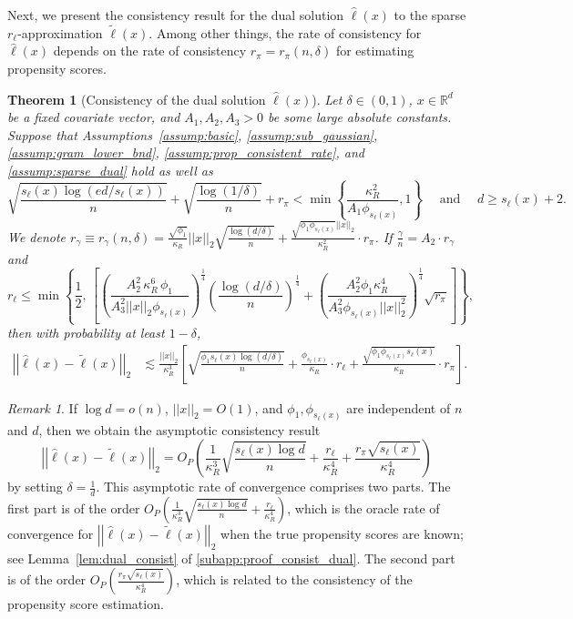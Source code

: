 \documentclass[ejsv2,noshowframe]{imsart}
\theoremstyle{plain}
\newtheorem{theorem}{Theorem}[section]
\theoremstyle{definition}
\theoremstyle{remark}
\newtheorem{remark}{Remark}
\newcommand{\norm}[1]{\left|\left| #1 \right|\right|}
\renewcommand{\hat}{\widehat}
\renewcommand{\tilde}{\widetilde}
\begin{document}
Next, we present the consistency result for the dual solution $\hat{\ell}(x)$ to the sparse $r_{\ell}$-approximation $\tilde{\ell}(x)$. Among other things, the rate of consistency for $\hat{\ell}(x)$ depends on the rate of consistency $r_{\pi}=r_{\pi}(n,\delta)$ for estimating propensity scores.


\begin{theorem}[Consistency of the dual solution $\hat{\ell}(x)$]
	\label{thm:dual_consist2}
	Let $\delta \in (0,1)$, $x\in \mathbb{R}^d$ be a fixed covariate vector, and $A_1,A_2,A_3>0$ be some large absolute constants. Suppose that Assumptions~\ref{assump:basic}, \ref{assump:sub_gaussian}, \ref{assump:gram_lower_bnd}, \ref{assump:prop_consistent_rate}, and \ref{assump:sparse_dual} hold
	as well as
	$$\sqrt{\frac{s_{\ell}(x)\log(ed/s_{\ell}(x))}{n}} + \sqrt{\frac{\log(1/\delta)}{n}} + r_{\pi} < \min\left\{\frac{\kappa_R^2}{A_1 \phi_{s_{\ell}(x)}}, 1 \right\} \quad \text{ and } \quad d\geq s_{\ell}(x) + 2.$$
	We denote $r_{\gamma}\equiv r_{\gamma}(n,\delta) = \frac{\sqrt{\phi_1}}{\kappa_R}\norm{x}_2\sqrt{\frac{\log(d/\delta)}{n}} + \frac{\sqrt{\phi_1 \phi_{s_{\ell}(x)}}\norm{x}_2}{\kappa_R^2} \cdot r_{\pi}$. If $\frac{\gamma}{n} = A_2\cdot r_{\gamma}$ and 
	$$r_{\ell} \leq \min\left\{\frac{1}{2},\, \left[\left(\frac{A_2^2 \,\kappa_R^6\, \phi_1}{A_3^2\norm{x}_2 \phi_{s_{\ell}(x)}}\right)^{\frac{1}{4}} \left(\frac{\log(d/\delta)}{n}\right)^{\frac{1}{4}} + \left(\frac{A_2^2 \phi_1 \kappa_R^4}{A_3^2 \phi_{s_{\ell}(x)} \norm{x}_2^2}\right)^{\frac{1}{4}} \sqrt{r_{\pi}}\right]\right\},$$
	then with probability at least $1-\delta$,
	\begin{align*}
		\norm{\hat{\ell}(x) - \tilde{\ell}(x)}_2
		&\lesssim \frac{\norm{x}_2}{\kappa_R^3}\left[ \sqrt{\frac{\phi_1 s_{\ell}(x)\log(d/\delta)}{n}} + \frac{\phi_{s_{\ell}(x)}}{\kappa_R} \cdot r_{\ell} + \frac{\sqrt{\phi_1 \phi_{s_{\ell}(x)} s_{\ell}(x)}}{\kappa_R} \cdot  r_{\pi} \right].
	\end{align*}
\end{theorem}

\begin{remark}
	\label{remark:dual_const}
	If $\log d=o(n)$, $\norm{x}_2=O(1)$, and $\phi_1,\phi_{s_{\ell}(x)}$ are independent of $n$ and $d$, then we obtain the asymptotic consistency result
	$$\norm{\hat{\ell}(x) -\tilde{\ell}(x)}_2 = O_P\left(\frac{1}{\kappa_R^3} \sqrt{\frac{s_{\ell}(x)\log d}{n}} + \frac{r_{\ell}}{\kappa_R^4} + \frac{r_{\pi}\sqrt{s_{\ell}(x)}}{\kappa_R^4} \right)$$
	by setting $\delta = \frac{1}{d}$. This asymptotic rate of convergence comprises two parts. The first part is of the order $O_P\left(\frac{1}{\kappa_R^3}\sqrt{\frac{s_{\ell}(x)\log d}{n}} + \frac{r_{\ell}}{\kappa_R^4}\right)$, which is the oracle rate of convergence for $\norm{\hat{\ell}(x) -\tilde{\ell}(x)}_2$ when the true propensity scores are known; see Lemma~\ref{lem:dual_consist} of \autoref{subapp:proof_consist_dual}. The second part is of the order $O_P\left(\frac{r_{\pi}\sqrt{s_{\ell}(x)} }{\kappa_R^4}\right)$, which is related to the consistency of the propensity score estimation.
\end{remark}
\end{document}
